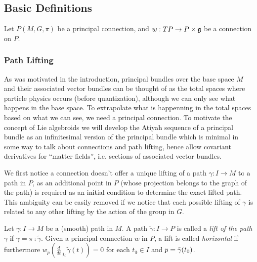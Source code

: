 \subsection{Basic Definitions}

Let $P(M, G, \pi)$ be a principal connection, and $w : TP \to P \times \mathfrak{g}$ be a connection on $P$.

\subsubsection{Path Lifting}

As was motivated in the introduction, principal bundles over the base space $M$ and their associated vector bundles can be thought of as the total spaces where  particle physics occurs (before quantization), although we can only see what happens in the base space. To extrapolate what is happenning in the total spaces based on what we can see, we need a principal connection. To motivate the concept of Lie algebroids we will develop the Atiyah sequence of a principal bundle as an infinitesimal version of the principal bundle which is minimal in some way to talk about connections and path lifting, hence allow covariant derivatives for ``matter fields'', i.e. sections of associated vector bundles.

We first notice a connection doesn't offer a unique lifting of a path $\gamma:I \to M$ to a path in $P$, as an additional point in $P$ (whose projection belongs to the graph of the path) is required as an initial condition to determine the exact lifted path. This ambiguity can be easily removed if we notice that each possible lifting of $\gamma$ is related to any other lifting by the action of the group in $G$.

\begin{definition} 
Let $\gamma: I \to M$ be a (smooth) path in $M$. A path $\tilde{\gamma}: I \to P$ is called a \emph{lift of the path $\gamma$} if $\gamma = \pi \comp \tilde{\gamma}$. Given a principal connection $w$ in $P$, a lift is called \emph{horizontal} if furthermore $w_p(\frac{d}{dt}_{|t_0} \tilde{\gamma}(t)) = 0$ for each $t_0 \in I$ and $p = \Tilde{\gamma}(t_0)$.
\end{definition}

